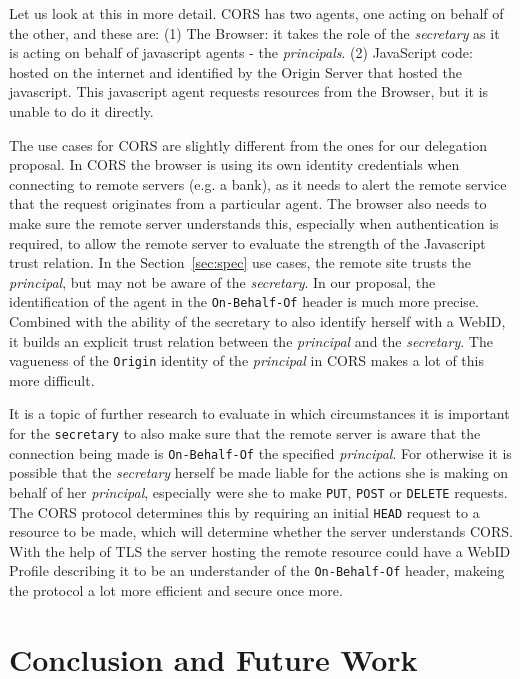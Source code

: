 \documentclass[a4paper]{llncs}
\begin{document}
Let us look at this in more detail.
CORS has two agents, one acting on behalf of the other, and these are: 
(1) The Browser: it takes the role of the \textit{secretary} as it is acting on behalf of javascript agents - the \textit{principals}.
(2) JavaScript code: hosted on the internet and identified by the Origin Server that hosted the javascript.
This javascript agent requests resources from the Browser, but it is unable to do it directly.

The use cases for CORS are slightly different from the ones for our delegation proposal. 
In CORS the browser is using its own identity credentials when connecting to remote servers (e.g. a bank), as it needs to alert the remote service that the request originates from a particular agent.
The browser also needs to make sure the remote server understands this, especially when authentication is required, to allow the remote server to evaluate the strength of the Javascript trust relation.
In the Section~\ref{sec:spec} use cases, the remote site trusts the \textit{principal}, but may not be aware of the \textit{secretary}.
In our proposal, the identification of the agent in the \lstinline|On-Behalf-Of| header is much more precise.
Combined with the ability of the secretary to also identify herself with a WebID, it builds an explicit trust relation between the \textit{principal} and the \textit{secretary}. The vagueness of the \lstinline|Origin| identity of the \textit{principal} in CORS makes a lot of this more difficult.

It is a topic of further research to evaluate in which circumstances it is important for the \lstinline|secretary| to also make sure that the remote server is aware that the connection being made is \lstinline|On-Behalf-Of| the specified \textit{principal}. 
For otherwise it is possible that the \textit{secretary} herself be made liable for the actions she is making on behalf of her \textit{principal}, especially were she to make \texttt{PUT}, \texttt{POST} or \texttt{DELETE} requests. 
The CORS protocol determines this by  requiring an initial \texttt{HEAD} request to a resource to be made, which will determine whether the server understands CORS.
With the help of TLS the server hosting the remote resource could have a WebID Profile describing it to be an understander of the \lstinline|On-Behalf-Of| header, makeing the protocol a lot more efficient and secure once more.

\section{Conclusion and Future Work}\label{sec:conclusion}
\end{document}
